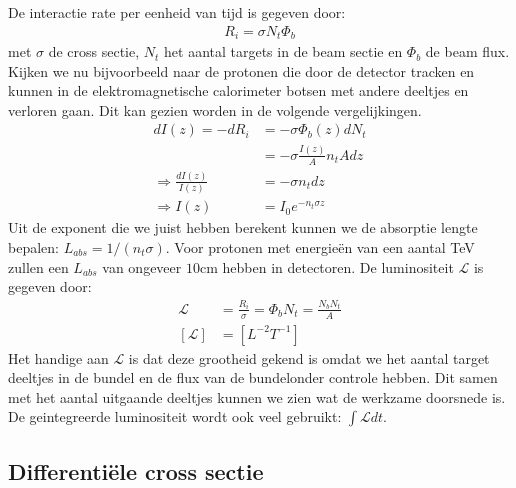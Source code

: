 \documentclass[../main.tex]{subfiles}
\begin{document}
De interactie rate per eenheid van tijd is gegeven door:
\begin{equation}
    \begin{aligned}
        \label{eq:int_rate}
        R_i=\sigma N_t \Phi_b
    \end{aligned}
\end{equation}
met $\sigma$ de cross sectie, $N_t$ het aantal targets in de beam sectie en $\Phi_b$ de beam flux. Kijken we nu bijvoorbeeld naar de protonen die door de detector tracken en kunnen in de elektromagnetische calorimeter botsen met andere deeltjes en verloren gaan. Dit kan gezien worden in de volgende vergelijkingen.
\begin{equation}
    \begin{aligned}
        \label{eq:beam_intensity}
        dI(z) = -dR_i &= -\sigma\Phi_b(z)dN_t\\
                      &= -\sigma\frac{I(z)}{A}n_tAdz\\
        \Rightarrow\frac{dI(z)}{I(z)}&=-\sigma n_tdz\\
        \Rightarrow I(z)&=I_0e^{-n_t\sigma z}
    \end{aligned}
\end{equation}
Uit de exponent die we juist hebben berekent kunnen we de absorptie lengte bepalen: $L_{abs}=1/(n_t\sigma)$. Voor protonen met energieën van een aantal TeV zullen een $L_{abs}$ van ongeveer $10$cm hebben in detectoren. De luminositeit $\mathcal{L}$ is gegeven door:
\begin{equation}
    \begin{aligned}
        \label{eq:luminositeit}
        \mathcal{L} &= \frac{R_i}{\sigma} = \Phi_b N_t = \frac{N_bN_t}{A}\\
        [\mathcal{L}] &= [L^{-2}T^{-1}]
    \end{aligned}
\end{equation}
Het handige aan $\mathcal{L}$ is dat deze grootheid gekend is omdat we het aantal target deeltjes in de bundel en de flux van de bundelonder controle hebben. Dit samen met het aantal uitgaande deeltjes kunnen we zien wat de werkzame doorsnede is. De geintegreerde luminositeit wordt ook veel gebruikt: $\int \mathcal{L}dt$.

\subsection{Differentiële cross sectie}%
\label{sub:differentiele_cross_sectie}
\end{document}
